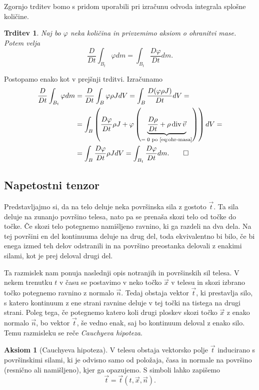 \documentclass[12pt,a4paper]{article}
\theoremstyle{definition} %
\newtheorem{aksiom}{Aksiom}
\theoremstyle{plain} %
\newtheorem{trditev}[definicija]{Trditev}
\numberwithin{equation}{section}
\renewcommand{\div}{\operatorname{div}}
\renewcommand{\phi}{\varphi}
\newcommand{\DD}[2]{\ensuremath{\frac{D #1}{D #2}}}
\newcommand{\DDt}[1]{\DD{#1}{t}}
\newcommand{\vv}{\vec{v}}
\newcommand{\vt}{\vec{t}}
\newcommand{\vn}{\vec{n}}
\newcommand{\vx}{\vec{x}}
\begin{document}
Zgornjo trditev bomo s pridom uporabili pri izračunu odvoda integrala splošne
količine.
\begin{trditev}
  \label{trd:swap-der-int}
  Naj bo $\phi$ neka količina in privzemimo aksiom o ohranitvi mase. Potem
  velja
  \begin{equation}
    \DDt{} \int_{B_t}\phi dm = \int_{B_t} \DDt{\phi} dm.
    \label{eq:swap-der-int}
  \end{equation}
\end{trditev}
\proof
Postopamo enako kot v prejšnji trditvi. Izračunamo
\begin{align*}
    \DDt{} \int_{B_t}\phi dm &=
    \DDt{} \int_{B}\phi \rho J dV =
    \int_{B} \DDt{(\phi \rho J)} dV  = \\ &=
  \int_{B} \left(\DDt{\phi} \rho J + \phi \left(\underbrace{\DDt{\rho} + \rho
  \div \vv}_{=\;0 \text{ po \eqref{eq:ohr-masa}}} \right) \right)dV  = \\ &=
  \int_{B} \DDt{\phi} \rho JdV =
  \int_{B_t} \DDt{\phi} dm. \qedhere
\end{align*}
\endproof

\subsection{Napetostni tenzor}
Predstavljajmo si, da na telo deluje neka površinska sila z gostoto $\vt$. Ta sila deluje
na zunanjo površino telesa, nato pa se prenaša skozi telo od točke do točke.
Če skozi telo potegnemo namišljeno ravnino, ki ga razdeli na dva dela.
Na tej površini en del kontinuuma deluje na drug del, toda ekvivalentno bi bilo,
če bi enega izmed teh delov odstranili in na površino preostanka delovali z
enakimi silami, kot je prej deloval drugi del.

Ta razmislek nam ponuja naslednji opis notranjih in površinskih sil telesa.
V nekem trenutku $t$ v času se postavimo v neko točko $\vx$ v telesu in skozi izbrano
točko potegnemo ravnino z normalo $\vn$. Tedaj obstaja vektor $\vt$, ki
prestavlja silo, s katero kontinuum z ene strani ravnine deluje v tej točki na
tistega na drugi strani. Poleg tega, če potegnemo katero koli drugi ploskev
skozi točko $\vx$ z enako normalo $\vn$, bo vektor $\vt$, še vedno enak, saj bo
kontinuum deloval z enako silo. Temu razmisleku se reče \emph{Cauchyeva
hipoteza}.

\begin{aksiom}[Cauchyeva hipoteza]
  V telesu obstaja vektorsko polje $\vt$ inducirano s površinskimi silami, ki
  je odvisno samo od položaja, časa in normale na površino (resnično ali
  namišljeno), kjer ga opazujemo.  S simboli lahko zapišemo
  \[
    \vt = \vt(t, \vx, \vn).
  \]
\end{aksiom}
\end{document}
